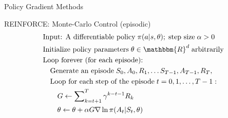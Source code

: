 \documentclass[ignorenonframetext,xcolor=x11names]{beamer}
\begin{document}
\begin{frame}[label=full]{Policy Gradient Methods}
\begin{block}{REINFORCE: Monte-Carlo Control (episodic)}
\begin{align*}
& \text{Input: A differentiable policy}\;\pi(a | s, \theta);\;\text{step size}\; \alpha > 0 \\
& \text{Initialize policy parameters}\; \theta \in \mathbbm{R}^d\;\text{arbitrarily} \\
& \text{Loop forever (for each episode):} \\
& \quad \text{Generate an episode}\; S_0, A_0, R_1, \ldots S_{T-1}, A_{T-1}, R_T, \\
& \quad \text{Loop for each step of the episode}\;t=0, 1, \ldots, T-1:\\
& \quad \quad G \leftarrow \sum\nolimits_{k=t+1}^T \gamma^{k - t - 1}R_k \\
& \quad \quad \theta \leftarrow \theta + \alpha G \nabla \ln \pi(A_t | S_t, \theta)
\end{align*}
\end{block}
\end{frame}
\end{document}

